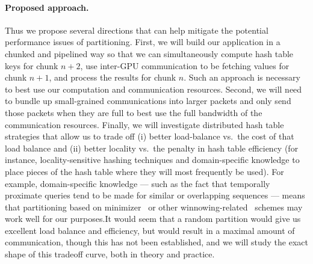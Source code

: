 \paragraph{Proposed approach.}
Thus we propose several directions that can help mitigate the potential performance issues of partitioning. First, we will build our application in a chunked and pipelined way so that we can simultaneously compute hash table keys for chunk $n+2$, use inter-GPU communication to be fetching values for chunk $n+1$, and process the results for chunk $n$. Such an approach is necessary to best use our computation and communication resources. Second, we will need to bundle up small-grained communications into larger packets and only send those packets when they are full to best use the full bandwidth of the communication resources. Finally, we will investigate distributed hash table strategies that allow us to trade off (i) better load-balance vs.\ the cost of that load balance and (ii) better locality vs.\ the penalty in hash table efficiency (for instance, locality-sensitive hashing techniques and domain-specific knowledge to place pieces of the hash table where they will most frequently be used).    
For example, domain-specific knowledge --- such as the fact that temporally proximate queries tend to be made for similar or overlapping sequences --- means that partitioning based on minimizer~\cite{roberts2004reducing} or other winnowing-related~\cite{Mar_ais_2018,DeBlasio_2019,Dutta_2022} schemes may work well for our purposes.It would seem that a random partition would give us excellent load balance and efficiency, but would result in a maximal amount of communication, though this has not been established, and we will study the exact shape of this tradeoff curve, both in theory and practice.






